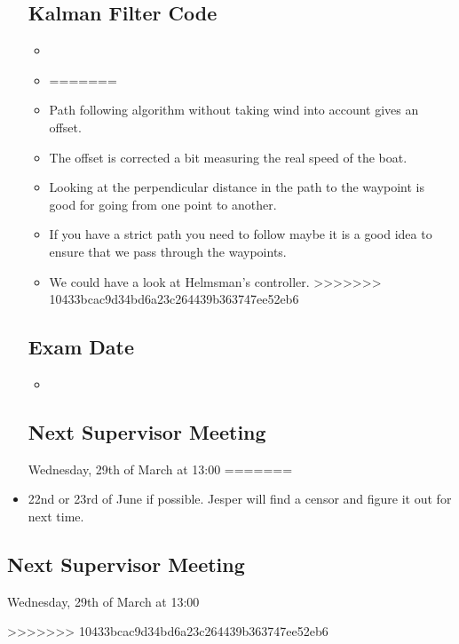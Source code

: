 \begin{itemize}
\subsection{Kalman Filter Code}
\begin{itemize}
	\item 
	\item 
=======
	\item Path following algorithm without taking wind into account gives an offset.
    \item The offset is corrected a bit measuring the real speed of the boat.
    \item Looking at the perpendicular distance in the path to the waypoint is good for going from one point to another.
    \item If you have a strict path you need to follow maybe it is a good idea to ensure that we pass through the waypoints.
    \item We could have a look at Helmsman's controller.
>>>>>>> 10433bcac9d34bd6a23c264439b363747ee52eb6
\end{itemize}
\subsection{Exam Date}
\begin{itemize}
<<<<<<< HEAD
	\item 
\end{itemize}
\subsection{Next Supervisor Meeting}
Wednesday, 29th of March at 13:00
=======
    \item 22nd or 23rd of June if possible. Jesper will find a censor and figure it out for next time.
\end{itemize}
\subsection{Next Supervisor Meeting}
Wednesday, 29th of March at 13:00

>>>>>>> 10433bcac9d34bd6a23c264439b363747ee52eb6
